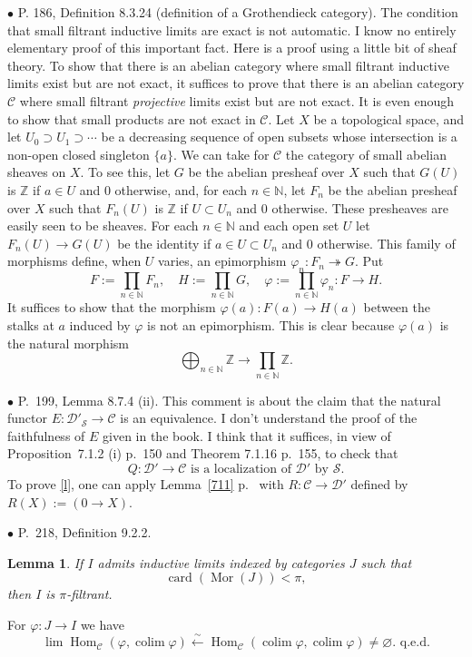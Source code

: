 \documentclass[12pt]{article}
\newtheorem{lem}[thm]{Lemma}
\theoremstyle{remark}
\newcommand{\bu}{\bullet}
\newcommand{\n}{\noindent}
\newcommand{\cc}{\mathcal}
\newcommand{\C}{\mathcal C}
\newcommand{\epi}{\twoheadrightarrow}
\newcommand{\p}{\varphi}
\newcommand{\be}{\begin{equation}}
\newcommand{\ee}{\end{equation}}
\newcommand{\pr}{Proposition}
\DeclareMathOperator*{\co}{colim}
\DeclareMathOperator{\h}{Hom}
\DeclareMathOperator{\Mor}{Mor}
\begin{document}
\n$\bu$ P. 186, Definition 8.3.24 (definition of a Grothendieck category). The condition that small filtrant inductive limits are exact is not automatic. I know no entirely elementary proof of this important fact. Here is a proof using a little bit of sheaf theory. To show that there is an abelian category where small filtrant inductive limits exist but are not exact, it suffices to prove that there is an abelian category $\C$ where small filtrant {\em projective} limits exist but are not exact. It is even enough to show that small products are not exact in $\C$. Let $X$ be a topological space, and let $U_0\supset U_1\supset\cdots$ be a decreasing sequence of open subsets whose intersection is a non-open closed singleton $\{a\}$. We can take for $\C$ the category of small abelian sheaves on $X$. To see this, let $G$ be the abelian presheaf over $X$ such that $G(U)$ is $\mathbb Z$ if $a\in U$ and 0 otherwise, and, for each $n\in\mathbb N$, let $F_n$ be the abelian presheaf over $X$ such that $F_n(U)$ is $\mathbb Z$ if $U\subset U_n$ and 0 otherwise. These presheaves are easily seen to be sheaves. For each $n\in\mathbb N$ and each open set $U$ let $F_n(U)\to G(U)$ be the identity if $a\in U\subset U_n$ and 0 otherwise. This family of morphisms define, when $U$ varies, an epimorphism $\p_n:F_n\epi G$. Put 
$$
F:=\prod_{n\in\mathbb N}F_n,\quad H:=\prod_{n\in\mathbb N}G,\quad\p:=\prod_{n\in\mathbb N}\p_n:F\to H.
$$ 
It suffices to show that the morphism $\p(a):F(a)\to H(a)$ between the stalks at $a$ induced by $\p$ is not an epimorphism. This is clear because $\p(a)$ is the natural morphism 
$$
\bigoplus_{n\in\mathbb N}\mathbb Z\to\prod_{n\in\mathbb N}\mathbb Z.
$$ 


\n$\bu$ P.~199, Lemma 8.7.4 (ii). This comment is about the claim that the natural functor $E:\cc D'_{\cc S}\to\C$ is an equivalence. I don't understand the proof of the faithfulness of $E$ given in the book. I think that it suffices, in view of \pr\ 7.1.2 (i) p.~150 and Theorem 7.1.16 p.~155, to check that 
%
\be\label{l}
Q:\cc D'\to\C\text{ is a localization of }\cc D'\text{ by }\cc S.
\ee
%
To prove \eqref{l}, one can apply Lemma~\ref{711} p.~\pageref{711} with $R:\C\to\cc D'$ defined by $R(X):=(0\to X)$. 


\n$\bu$ P.~218, Definition 9.2.2. 
%
\begin{lem}\label{922}
If $I$ admits inductive limits indexed by categories $J$ such that 
$$
\operatorname{card}(\Mor(J))<\pi,
$$ 
then $I$ is $\pi$-filtrant. 
\end{lem}
%
\n{\em Proof.} For $\p:J\to I$ we have
$$
\lim\h_\C(\p,\co\p)\xleftarrow\sim\h_\C(\co\p,\co\p)\neq\varnothing.\text{ q.e.d.}
$$ 
\end{document}
